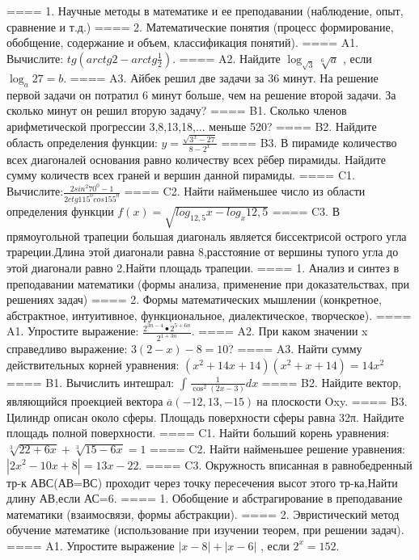 ====
1. Научные методы в математике и ее преподавании (наблюдение, опыт, сравнение и т.д.)
====
2. Математические понятия (процесс формирование, обобщение, содержание и объем, классификация понятий).
====
A1. Вычислите: \(tg\left( arctg2 - arctg\frac{1}{2} \right)\).
====
A2. Найдите \(\log_{\sqrt{3}}\sqrt[6]{a}\) , если \(\log_{a}27 = b\).
====
A3. Айбек решил две задачи за 36 минут. На решение первой задачи он потратил 6 минут больше, чем на решение второй задачи. За сколько минут он решил вторую задачу?
====
B1. Сколько членов арифметической прогрессии 3,8,13,18,... меньше 520?
====
B2. Найдите область определения функции: \(y = \frac{\sqrt{3^{x} - 27}}{8 - 2^{x}}\)
====
B3. В пирамиде количество всех диагоналей основания равно количеству всех рёбер пирамиды. Найдите сумму количеств всех граней и вершин данной пирамиды.
====
C1. Вычислите:\(\frac{2sin^{2}70^{0} - 1}{2ctg115^{0}cos155^{0}}\)
====
C2. Найти найменьшее число из области определения функции \(f(x) = \sqrt{log_{12,5}x - log_{x}12,5}\)
====
C3. В прямоугольной трапеции большая диагональ является биссектрисой острого угла трареции.Длина этой диагонали равна 8,расстояние от вершины тупого угла до этой диагонали равно 2.Найти площадь трапеции.
====
1. Анализ и синтез в преподавании математики (формы анализа, применение при доказательствах, при решениях задач)
====
2. Формы математических мышлении (конкретное, абстрактное, интуитивное, функциональное, диалектическое, творческое).
====
A1. Упростите выражение: \(\frac{2^{3n - 4} \bullet 2^{5 + 6n}}{2^{1 + 3n}}\).
====
A2. При каком значении x справедливо выражение: \(3(2 - x) - 8 = 10\)?
====
A3. Найти сумму действительных корней уравнения: \((x^{2} + 14x + 14)(x^{2} + x + 14) = 14x^{2}\)
====
B1. Вычислить интешрал: \(\int_{}^{}{\frac{1}{\cos^{2}(2x - 3)}dx}\)
====
B2. Найдите вектор, являющийся проекцией вектора \(\overline{a}( - 12,13, - 15)\ \)на плоскости Oxy.
====
B3. Цилиндр описан около сферы. Площадь поверхности сферы равна 32π. Найдите площадь полной поверхности.
====
C1. Найти больший корень уравнения:\(\sqrt[3]{22 + 6x} + \sqrt[3]{15 - 6x} = 1\)
====
C2. Найти найменьшее решение уравнения:\(\left| 2x^{2} - 10x + 8 \right| = 13x - 22\).
====
C3. Окружность вписанная в равнобедренный тр-к АВС(АВ=ВС) проходит через точку пересечения высот этого тр-ка,Найти длину АВ,если АС=6.
====
1. Обобщение и абстрагирование в преподавание математики (взаимосвязи, формы абстракции).
====
2. Эвристический метод обучение математике (использование при изучении теорем, при решении задач).
====
A1. Упростите выражение \(|x - 8| + |x - 6|\) , если \(2^{x} = 152\).
